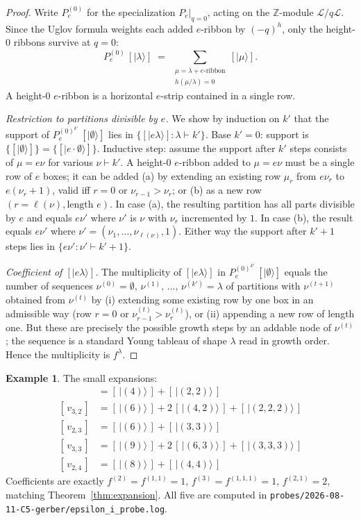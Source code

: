 \documentclass[11pt]{article}
\theoremstyle{definition}
\newtheorem{example}[theorem]{Example}
\newcommand{\ZZ}{\mathbb{Z}}
\newcommand{\Lcr}{\mathcal{L}}
\begin{document}
\begin{proof}
Write $P_e^{(0)}$ for the specialization $P_e|_{q=0}$, acting on the
$\ZZ$-module $\Lcr/q\Lcr$. Since the Uglov formula weights each added
$e$-ribbon by $(-q)^h$, only the height-$0$ ribbons survive at $q = 0$:
\[
  P_e^{(0)} \,[|\lambda\rangle] \;=\; \sum_{\substack{\mu = \lambda + e\text{-ribbon} \\ h(\mu/\lambda) = 0}} [|\mu\rangle].
\]
A height-$0$ $e$-ribbon is a horizontal $e$-strip contained in a single row.

\emph{Restriction to partitions divisible by $e$.} We show by induction on $k'$
that the support of $P_e^{(0)^{k'}} \,[|\emptyset\rangle]$ lies in
$\{[|e\lambda\rangle] : \lambda \vdash k'\}$. Base $k' = 0$: support is
$\{[|\emptyset\rangle]\} = \{[|e \cdot \emptyset\rangle]\}$.
Inductive step: assume the support after $k'$ steps consists of $\mu = e\nu$
for various $\nu \vdash k'$. A height-$0$ $e$-ribbon added to $\mu = e\nu$
must be a single row of $e$ boxes; it can be added (a) by extending an
existing row $\mu_r$ from $e\nu_r$ to $e(\nu_r + 1)$, valid iff $r = 0$
or $\nu_{r-1} > \nu_r$; or (b) as a new row $(r = \ell(\nu), \text{length } e)$.
In case (a), the resulting partition has all parts divisible by $e$ and
equals $e\nu'$ where $\nu'$ is $\nu$ with $\nu_r$ incremented by $1$. In
case (b), the result equals $e\nu'$ where $\nu' = (\nu_1, \dots, \nu_{\ell(\nu)}, 1)$.
Either way the support after $k' + 1$ steps lies in
$\{e\nu' : \nu' \vdash k'+1\}$.

\emph{Coefficient of $[|e\lambda\rangle]$.} The multiplicity of $[|e\lambda\rangle]$
in $P_e^{(0)^{k'}} \,[|\emptyset\rangle]$ equals the number of sequences
$\nu^{(0)} = \emptyset,\, \nu^{(1)},\, \dots,\, \nu^{(k')} = \lambda$ of
partitions with $\nu^{(t+1)}$ obtained from $\nu^{(t)}$ by (i) extending
some existing row by one box in an admissible way (row $r = 0$ or
$\nu^{(t)}_{r-1} > \nu^{(t)}_r$), or (ii) appending a new row of length one.
But these are precisely the possible growth steps by an addable node of
$\nu^{(t)}$; the sequence is a standard Young tableau of shape $\lambda$
read in growth order. Hence the multiplicity is $f^\lambda$.
\end{proof}

\begin{example}\label{ex:expansions}
The small expansions:
\begin{align*}
  [\,v_{2,2}\,] &= [\,|(4)\rangle\,] + [\,|(2,2)\rangle\,] \\
  [\,v_{3,2}\,] &= [\,|(6)\rangle\,] + 2\,[\,|(4,2)\rangle\,] + [\,|(2,2,2)\rangle\,] \\
  [\,v_{2,3}\,] &= [\,|(6)\rangle\,] + [\,|(3,3)\rangle\,] \\
  [\,v_{3,3}\,] &= [\,|(9)\rangle\,] + 2\,[\,|(6,3)\rangle\,] + [\,|(3,3,3)\rangle\,] \\
  [\,v_{2,4}\,] &= [\,|(8)\rangle\,] + [\,|(4,4)\rangle\,]
\end{align*}
Coefficients are exactly $f^{(2)} = f^{(1,1)} = 1$, $f^{(3)} = f^{(1,1,1)} = 1$,
$f^{(2,1)} = 2$, matching Theorem~\ref{thm:expansion}. All five are computed
in \verb|probes/2026-08-11-C5-gerber/epsilon_i_probe.log|.
\end{example}
\end{document}

